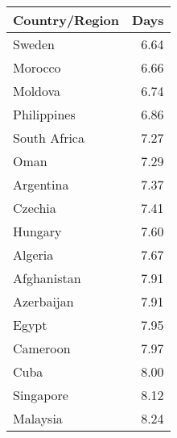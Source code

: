 \begin{tabular}{lr}
\toprule
Country/Region &  Days \\
\midrule
        Sweden &  6.64 \\
       Morocco &  6.66 \\
       Moldova &  6.74 \\
   Philippines &  6.86 \\
  South Africa &  7.27 \\
          Oman &  7.29 \\
     Argentina &  7.37 \\
       Czechia &  7.41 \\
       Hungary &  7.60 \\
       Algeria &  7.67 \\
   Afghanistan &  7.91 \\
    Azerbaijan &  7.91 \\
         Egypt &  7.95 \\
      Cameroon &  7.97 \\
          Cuba &  8.00 \\
     Singapore &  8.12 \\
      Malaysia &  8.24 \\
\bottomrule
\end{tabular}
